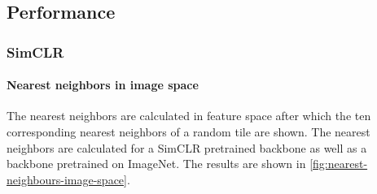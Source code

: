 \subsection{Performance}

\subsubsection{SimCLR}

\paragraph{Nearest neighbors in image space}
The nearest neighbors are calculated in feature space after which the ten corresponding nearest neighbors of a random tile are shown.
The nearest neighbors are calculated for a SimCLR pretrained backbone as well as a backbone pretrained on ImageNet.
The results are shown in \cref{fig:nearest-neighbours-image-space}.

